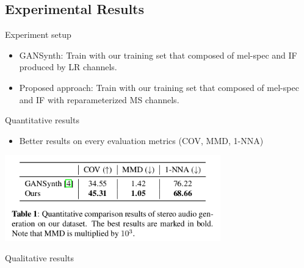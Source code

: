 \subsection{Experimental Results}
\begin{frame}{Experiment setup}
    \begin{itemize}
        \item GANSynth: Train with our training set that composed of mel-spec and IF produced by LR channels.
        \bigskip
        \bigskip
        \item Proposed approach: Train with our training set that composed of mel-spec and IF with reparameterized MS channels.
    \end{itemize}
\end{frame}

\begin{frame}{Quantitative results}
    \begin{itemize}
        \item Better results on every evaluation metrics (COV, MMD, 1-NNA)
    \end{itemize}
    \bigskip
    \bigskip
    \centering
    \includegraphics[width=0.7\textwidth]{Presentation/figures/result_table.png}
\end{frame}

\begin{frame}{Qualitative results}
    
\end{frame}